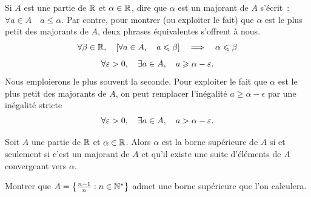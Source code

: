\documentclass{magnolia}
\begin{document}
  \begin{remarques}
  \remarque Si $A$ est une partie de $\mathbb{R}$ et $\alpha\in\mathbb{R}$, dire que
    $\alpha$ est un majorant de $A$ s'écrit~: $\forall a\in A \quad a\leq \alpha$.
    Par contre, pour montrer (ou exploiter le fait) que $\alpha$ est le plus
    petit des majorants de $A$, deux phrases équivalentes s'offrent à nous.
    \[\forall \beta\in\mathbb{R} ,\quad \left[\forall a\in A ,\quad a\leqslant\beta\right]\quad\Longrightarrow\quad
           \alpha\leqslant\beta\]
    \[\forall \varepsilon>0 ,\quad \exists a\in A ,\quad a\geqslant \alpha-\varepsilon.\]
    Nous emploierons le plus souvent la seconde.
  \remarque Pour exploiter le fait que $\alpha$ est le plus petit des majorants de
    $A$, on peut remplacer l'inégalité $a\geq \alpha-\epsilon$ par une inégalité stricte
    \[\forall \varepsilon>0 ,\quad \exists a\in A ,\quad a> \alpha-\varepsilon.\]
  \end{remarques}

\begin{proposition}
Soit $A$ une partie de $\mathbb{R}$ et $\alpha\in\mathbb{R}$. Alors $\alpha$ est la borne supérieure
de $A$ si et seulement si c'est un majorant de $A$ et qu'il existe une suite
d'éléments de $A$ convergeant vers $\alpha$.
\end{proposition}  


\begin{exoUnique}
\exo Montrer que $A=\left\{\frac{n-1}{n} : n\in{\mathbb{N}^*}\right\}$ admet une borne
supérieure que l'on calculera.
\end{exoUnique}
\end{document}
